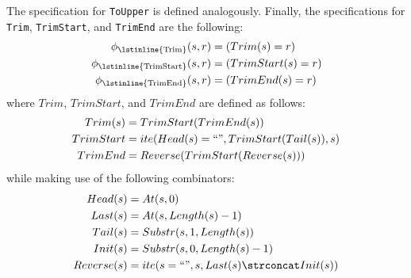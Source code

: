 %
The specification for \lstinline{ToUpper} is defined analogously.
Finally, the specifications for \lstinline{Trim}, \lstinline{TrimStart}, and
\lstinline{TrimEnd} are the following:
%
\begin{align*}
  \phi{}_{\text{\lstinline{Trim}}}(s, r)      &= (Trim(s) = r)      \\
  \phi{}_{\text{\lstinline{TrimStart}}}(s, r) &= (TrimStart(s) = r) \\
  \phi{}_{\text{\lstinline{TrimEnd}}}(s, r)   &= (TrimEnd(s) = r)   \\
\end{align*}
%
where $Trim$, $TrimStart$, and $TrimEnd$ are defined as follows:
%
\begin{align*}
  Trim(s)   &= TrimStart(TrimEnd(s)) \\
  TrimStart &= ite(Head(s) = `` ", TrimStart(Tail(s)), s) \\
  TrimEnd   &= Reverse(TrimStart(Reverse(s)))
\end{align*}
%
while making use of the following combinators:
%
\begin{align*}
  Head(s) &= At(s, 0) \\
  Last(s) &= At(s, Length(s) - 1) \\
  Tail(s) &= Substr(s, 1, Length(s)) \\
  Init(s) &= Substr(s, 0, Length(s) - 1) \\
  Reverse(s) &= ite(s = ``", s, Last(s) \strconcat Init(s))
\end{align*}
